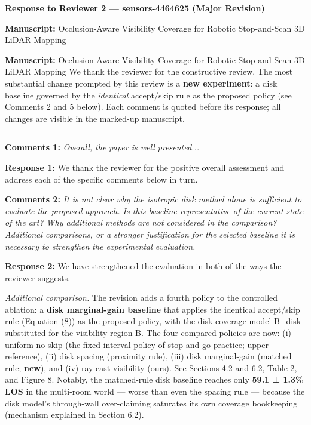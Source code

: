 \documentclass[11pt]{article}
\begin{document}
\begin{center}\LARGE\bfseries Response to Reviewer 2 — sensors-4464625 (Major Revision)\end{center}

\textbf{Manuscript:} Occlusion-Aware Visibility Coverage for Robotic Stop-and-Scan 3D LiDAR Mapping

\textbf{Manuscript:} Occlusion-Aware Visibility Coverage for Robotic Stop-and-Scan 3D LiDAR Mapping
We thank the reviewer for the constructive review. The most substantial change prompted by this review is a \textbf{new experiment}: a disk baseline governed by the \emph{identical} accept/skip rule as the proposed policy (see Comments 2 and 5 below). Each comment is quoted before its response; all changes are visible in the marked-up manuscript.

\medskip\hrule\medskip

\textbf{Comments 1:} \emph{\emph{Overall, the paper is well presented...}}

\textbf{Response 1:} We thank the reviewer for the positive overall assessment and address each of the specific comments below in turn.

\medskip

\textbf{Comments 2:} \emph{\emph{It is not clear why the isotropic disk method alone is sufficient to evaluate the proposed approach. Is this baseline representative of the current state of the art? Why additional methods are not considered in the comparison? Additional comparisons, or a stronger justification for the selected baseline it is necessary to strengthen the experimental evaluation.}}

\textbf{Response 2:} We have strengthened the evaluation in both of the ways the reviewer suggests.

\emph{Additional comparison.} The revision adds a fourth policy to the controlled ablation: a \textbf{disk marginal-gain baseline} that applies the identical accept/skip rule (Equation (8)) as the proposed policy, with the disk coverage model B\_disk substituted for the visibility region B. The four compared policies are now: (i) uniform no-skip (the fixed-interval policy of stop-and-go practice; upper reference), (ii) disk spacing (proximity rule), (iii) disk marginal-gain (matched rule; \textbf{new}), and (iv) ray-cast visibility (ours). See Sections 4.2 and 6.2, Table 2, and Figure 8. Notably, the matched-rule disk baseline reaches only \textbf{59.1 ± 1.3\% LOS} in the multi-room world — worse than even the spacing rule — because the disk model's through-wall over-claiming saturates its own coverage bookkeeping (mechanism explained in Section 6.2).
\end{document}

